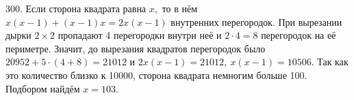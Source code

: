 300. Если сторона квадрата равна $x,$ то в нём $x(x-1)+(x-1)x=2x(x-1)$ внутренних перегородок. При вырезании дырки $2\times2$ пропадают 4 перегородки внутри неё и $2\cdot4=8$ перегородок на её периметре. Значит, до вырезания квадратов перегородок было $20952+5\cdot(4+8)=21012$ и $2x(x-1)=21012,\ x(x-1)=10506.$ Так как это количество близко к 10000, сторона квадрата немногим больше 100. Подбором найдём $x=103.$\\
